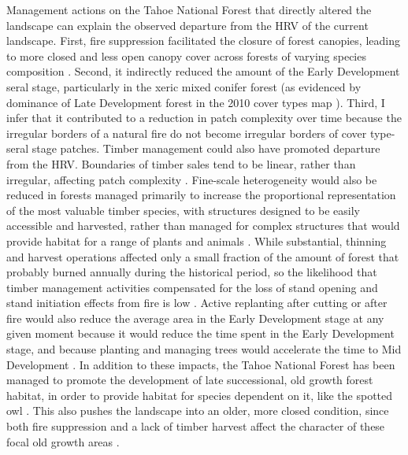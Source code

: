 Management actions on the Tahoe National Forest that directly altered the landscape can explain the observed departure from the HRV of the current landscape. First, fire suppression facilitated the closure of forest canopies, leading to more closed and less open canopy cover across forests of varying species composition \citep{Beaty2007}. Second, it indirectly reduced the amount of the Early Development seral stage, particularly in the xeric mixed conifer forest (as evidenced by dominance of Late Development forest in the 2010 cover types map \citep{USDAForestService2009}). Third, I infer that it contributed to a reduction in patch complexity over time because the irregular borders of a natural fire do not become irregular borders of cover type-seral stage patches. Timber management could also have promoted departure from the HRV. Boundaries of timber sales tend to be linear, rather than irregular, affecting patch complexity \citep{USDAForestService2012}. Fine-scale heterogeneity would also be reduced in forests managed primarily to increase the proportional representation of the most valuable timber species, with structures designed to be easily accessible and harvested, rather than managed for complex structures that would provide habitat for a range of plants and animals \citep{Franklin2002}. While substantial, thinning and harvest operations affected only a small fraction of the amount of forest that probably burned annually during the historical period, so the likelihood that timber management activities compensated for the loss of stand opening and stand initiation effects from fire is low \citep{USDAForestService2012,Cushman2011}. Active replanting after cutting or after fire would also reduce the average area in the Early Development stage at any given moment because it would reduce the time spent in the Early Development stage, and because planting and managing trees would accelerate the time to Mid Development \citep{Dellasala2014}. In addition to these impacts, the Tahoe National Forest has been managed to promote the development of late successional, old growth forest habitat, in order to provide habitat for species dependent on it, like the spotted owl \citep{USDAForestService2004a}. This also pushes the landscape into an older, more closed condition, since both fire suppression and a lack of timber harvest affect the character of these focal old growth areas \citep{Franklin1996}.

